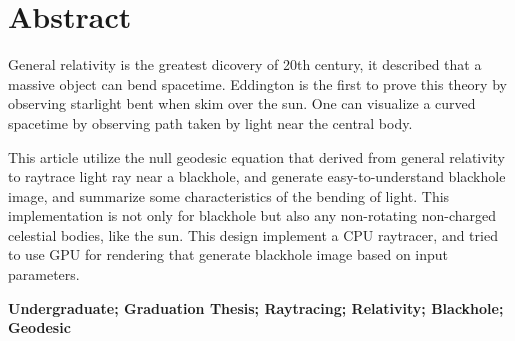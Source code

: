 \vspace*{17mm}

{\let\clearpage\relax \chapter*{
  \textmd{Abstract}\vskip -3bp}}
\setcounter{page}{2}

\setlength{\parskip}{0em}

General relativity is the greatest dicovery of 20th century, it described that a massive object can bend spacetime. Eddington is the first to prove this theory by observing starlight bent when skim over the sun. One can visualize a curved spacetime by observing path taken by light near the central body.

This article utilize the null geodesic equation that derived from general relativity to raytrace light ray near a blackhole, and generate easy-to-understand blackhole image, and summarize some characteristics of the bending of light. This implementation is not only for blackhole but also any non-rotating non-charged celestial bodies, like the sun. This design implement a CPU raytracer, and tried to use GPU for rendering that generate blackhole image based on input parameters.


\vspace{3ex}\noindent\textbf{Undergraduate; Graduation Thesis; Raytracing; Relativity; Blackhole; Geodesic}
\newpage
